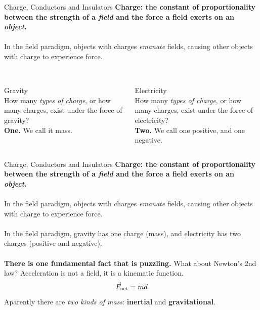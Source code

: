 \documentclass{beamer}
\begin{document}
\begin{frame}{Charge, Conductors and Insulators}
\centering
\textbf{\alert{Charge: the constant of proportionality between the strength of a \textit{field} and the force a field exerts on an \textit{object}.}} \\
\hrulefill \\
\small
In the field paradigm, objects with charges \textit{emanate} fields, causing other objects with charge to experience force. \\
\hrulefill \\
\begin{columns}[T]
\begin{column}{0.5\textwidth}
\alert{Gravity} \\
How many \textit{types of charge}, or how many charges, exist under the force of gravity? \\
\textbf{One.} We call it mass.
\end{column}
\begin{column}{0.5\textwidth}
\alert{Electricity} \\
How many \textit{types of charge}, or how many charges, exist under the force of electricity? \\
\textbf{Two.} We call one positive, and one negative.
\end{column}
\end{columns}
\end{frame}

\begin{frame}{Charge, Conductors and Insulators}
\centering
\textbf{\alert{Charge: the constant of proportionality between the strength of a \textit{field} and the force a field exerts on an \textit{object}.}} \\
\hrulefill \\
\small
In the field paradigm, objects with charges \textit{emanate} fields, causing other objects with charge to experience force. \\
\hrulefill \\
In the field paradigm, gravity has one charge (mass), and electricity has two charges (positive and negative). \\
\hrulefill \\
\textbf{There is one fundamental fact that is puzzling.} What about Newton's 2nd law?  Acceleration is not a field, it is a kinematic function.
\begin{equation}
\vec{F}_{\rm net} = m \vec{a}
\end{equation}
Aparently there are \textit{two kinds of mass}: \textbf{inertial} and \textbf{gravitational}.  
\end{frame}
\end{document}
